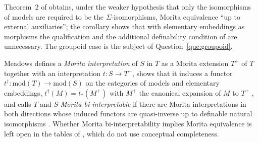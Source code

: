\documentclass[11pt]{amsart}
\theoremstyle{definition}
\begin{document}
Theorem~2 of \cite{Hudetz19} obtains, under the weaker hypothesis that
only the isomorphisms of models are required to be the
$\Sigma$-isomorphisms, Morita equivalence ``up to external
auxiliaries''; the corollary shows that with elementary embeddings as
morphisms the qualification and the additional definability condition of
\cite[Thm.~3]{Hudetz19} are unnecessary. The groupoid case is the
subject of Question~\ref{que:groupoid}.

Meadows \cite{Meadows24} defines a \emph{Morita interpretation} of $S$
in $T$ as a Morita extension $T^+$ of $T$ together with an
interpretation $t\colon S\to T^+$, shows that it induces a functor
$t^\dagger\colon\mathrm{mod}(T)\to\mathrm{mod}(S)$ on the categories
of models and elementary embeddings, $t^\dagger(M)=t_*(M^+)$ with $M^+$
the canonical expansion of $M$ to $T^+$ \cite[Def.~39, Thm.~42]{Meadows24},
and calls $T$ and $S$ \emph{Morita bi-interpretable} if there are
Morita interpretations in both directions whose induced functors are
quasi-inverse up to definable natural isomorphisms
\cite[Def.~43--44]{Meadows24}. Whether Morita bi-interpretability implies
Morita equivalence is left open in the tables of
\cite[\S5, \S5.1.1]{Meadows24}, which do not use conceptual completeness.
\end{document}
